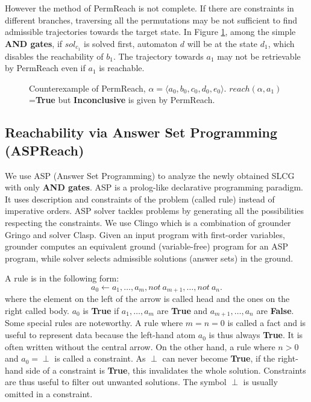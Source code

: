 However the method of PermReach is not complete. 
If there are constraints in different branches, traversing all the permutations may be not sufficient to find admissible trajectories towards the target state.
In Figure \ref{FigConflictInForks}, among the simple \textbf{AND gates}, if $sol_{c_1}$ is solved first, automaton $d$ will be at the state $d_1$, which disables the reachability of $b_1$.
The trajectory towards $a_1$ may not be retrievable by PermReach even if $a_1$ is reachable.
\begin{figure}[ht]
\centering

\caption[Counterexample of PermReach]{Counterexample of PermReach, $\alpha=\langle a_0,b_0,c_0,d_0,e_0\rangle$. 
$reach(\alpha,a_1)$=\textbf{True} but \textbf{Inconclusive} is given by PermReach.
}\label{FigConflictInForks}
\end{figure}
\subsection{Reachability via Answer Set Programming (ASPReach)}
We use ASP  (Answer Set Programming) \cite{baral2003knowledge} to analyze the newly obtained SLCG with only \textbf{AND gates}.
ASP is a prolog-like declarative programming paradigm.
It uses description and constraints of the problem (called rule) instead of imperative orders.
ASP solver tackles problems by generating all the possibilities respecting the constraints. 
We use Clingo \cite{gebser2016theory} which is a combination of grounder Gringo and solver Clasp. 
Given an input program with first-order variables, grounder computes an equivalent ground (variable-free) program for an ASP program, while solver selects admissible solutions (answer sets) in the ground.

A rule is in the following form:
$$a_0 \gets a_1 , \ldots , a_m, not\ a_{m+1}, \ldots , not\ a_n.$$
where the element on the left of the arrow is called head and the ones on the right called body.
$a_0$ is \textbf{True} if $a_1 , \ldots , a_m$ are \textbf{True} and $a_{m+1}, \ldots , a_n$ are \textbf{False}.
Some special rules are noteworthy. 
A rule where $m = n = 0$ is called a fact and is useful to represent data because the left-hand atom $a_0$ is thus always \textbf{True}.
It is often written without the central arrow.
On the other hand, a rule where $n > 0$ and $a_0 = \perp$ is called a constraint.
As $\perp$ can never become \textbf{True}, if the right-hand side of a constraint is \textbf{True}, this invalidates the whole solution.
Constraints are thus useful to filter out unwanted solutions.
The symbol $\perp$ is usually omitted in a constraint.

